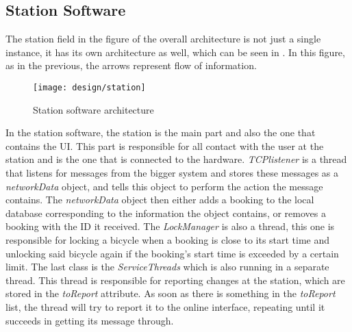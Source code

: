 \subsection{Station Software}
The station field in the figure of the overall architecture is not just a single instance, it has its own architecture as well, which can be seen in . In this figure, as in the previous, the arrows represent flow of information.

\begin{figure}[h]
	\centering
	\texttt{[image: design/station]}
	\caption{Station software architecture}\label{fig:stationarch}
\end{figure}

In the station software, the station is the main part and also the one that contains the UI. 
This part is responsible for all contact with the user at the station and is the one that is connected to the hardware.
\textit{TCPlistener} is a thread that listens for messages from the bigger system and stores these messages as a \textit{networkData} object, and tells this object to perform the action the message contains.
The \textit{networkData} object then either adds a booking to the local database corresponding to the information the object contains, or removes a booking with the ID it received.
The \textit{LockManager} is also a thread, this one is responsible for locking a bicycle when a booking is close to its start time and unlocking said bicycle again if the booking's start time is exceeded by a certain limit.
The last class is the \textit{ServiceThreads} which is also running in a separate thread.
This thread is responsible for reporting changes at the station, which are stored in the \textit{toReport} attribute.
As soon as there is something in the \textit{toReport} list, the thread will try to report it to the online interface, repeating until it succeeds in getting its message through.